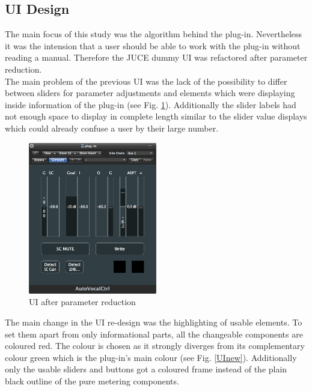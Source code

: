 \subsection{UI Design}

The main focus of this study was the algorithm behind the plug-in. Nevertheless it was the intension that a user should be able to work with the plug-in without reading a manual. Therefore the JUCE dummy UI was refactored after parameter reduction.\\
The main problem of the previous UI was the lack of the possibility to differ between sliders for parameter adjustments and elements which were displaying inside information of the plug-in (see Fig. \ref{UIold}). Additionally the slider labels had not enough space to display in complete length similar to the slider value displays which could already confuse a user by their large number.\\

\begin{figure}[H]
\includegraphics[width=0.5\textwidth]{images/designVorher}
	\centering
	\caption{UI after parameter reduction}
	\label{UIold}
\end{figure}

The main change in the UI re-design was the highlighting of usable elements. To set them apart from only informational parts, all the changeable components are coloured red. The colour is chosen as it strongly diverges from its complementary colour green which is the plug-in’s main colour (see Fig. \ref{UInew}). Additionally only the usable sliders and buttons got a coloured frame instead of the plain black outline of the pure metering components.\\

